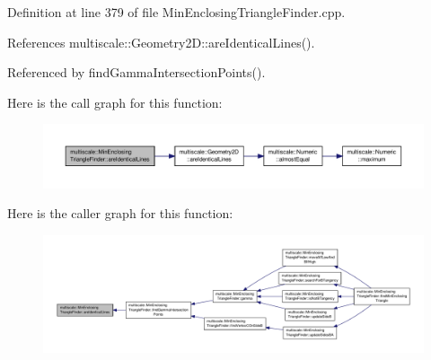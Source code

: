 Definition at line 379 of file Min\-Enclosing\-Triangle\-Finder.\-cpp.



References multiscale\-::\-Geometry2\-D\-::are\-Identical\-Lines().



Referenced by find\-Gamma\-Intersection\-Points().



Here is the call graph for this function\-:\nopagebreak
\begin{figure}[H]
\begin{center}
\leavevmode
\includegraphics[width=350pt]{classmultiscale_1_1MinEnclosingTriangleFinder_a65a15d407aeab7f9b81fe527c9a53e81_cgraph}
\end{center}
\end{figure}




Here is the caller graph for this function\-:\nopagebreak
\begin{figure}[H]
\begin{center}
\leavevmode
\includegraphics[width=350pt]{classmultiscale_1_1MinEnclosingTriangleFinder_a65a15d407aeab7f9b81fe527c9a53e81_icgraph}
\end{center}
\end{figure}


